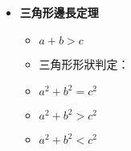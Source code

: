 \begin{itemize}
  \item \textbf{三角形邊長定理}
  \begin{itemize}
    \item $a+b>c$
    \item 三角形形狀判定：
    \item {}$a^2+b^2=c^2$
    \item {}$a^2+b^2>c^2$
    \item {}$a^2+b^2<c^2$
  \end{itemize}
  
\end{itemize}
